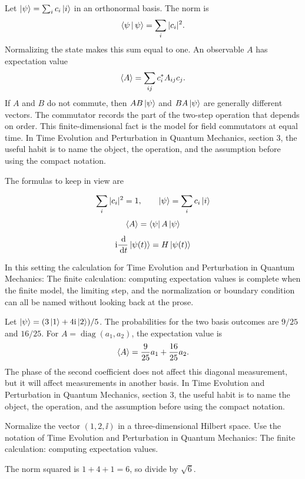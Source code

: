 Let \(\left|\psi\right\rangle=\sum_i c_i\left|i\right\rangle\) in an orthonormal basis.  The norm is
\[
  \left\langle \psi\,\middle|\,\psi\right\rangle=\sum_i |c_i|^2.
\]
Normalizing the state makes this sum equal to one.  An observable \(A\) has expectation value
\[
  \left\langle A\right\rangle=\sum_{ij}c_i^*A_{ij}c_j.
\]
If \(A\) and \(B\) do not commute, then \(AB\left|\psi\right\rangle\) and \(BA\left|\psi\right\rangle\) are generally different vectors.  The commutator records the part of the two-step operation that depends on order.  This finite-dimensional fact is the model for field commutators at equal time.  In Time Evolution and Perturbation in Quantum Mechanics, section 3, the useful habit is to name the object, the operation, and the assumption before using the compact notation.

The formulas to keep in view are

\[
  \sum_i |c_i|^2=1,\qquad \left|\psi\right\rangle=\sum_i c_i\left|i\right\rangle
\]
\[
  \left\langle A\right\rangle=\left\langle \psi\right|A\left|\psi\right\rangle
\]
\[
  \mathrm i\frac{\,\mathrm d}{\,\mathrm d t}\left|\psi(t)\right\rangle=H\left|\psi(t)\right\rangle
\]

In this setting the calculation for Time Evolution and Perturbation in Quantum Mechanics: The finite calculation: computing expectation values is complete when the finite model, the limiting step, and the normalization or boundary condition can all be named without looking back at the prose.




\begin{example}
Let \(\left|\psi\right\rangle=(3\left|1\right\rangle+4\mathrm i\left|2\right\rangle)/5\).  The probabilities for the two basis outcomes are \(9/25\) and \(16/25\).  For \(A=\operatorname{diag}(a_1,a_2)\), the expectation value is
\[
  \left\langle A\right\rangle=\frac{9}{25}a_1+\frac{16}{25}a_2.
\]
The phase of the second coefficient does not affect this diagonal measurement, but it will affect measurements in another basis.  In Time Evolution and Perturbation in Quantum Mechanics, section 3, the useful habit is to name the object, the operation, and the assumption before using the compact notation.
\end{example}



\begin{exercise}
Normalize the vector \((1,2,\ii)\) in a three-dimensional Hilbert space.  Use the notation of Time Evolution and Perturbation in Quantum Mechanics: The finite calculation: computing expectation values.
\begin{answer}
The norm squared is \(1+4+1=6\), so divide by \(\sqrt6\).
\end{answer}
\end{exercise}


